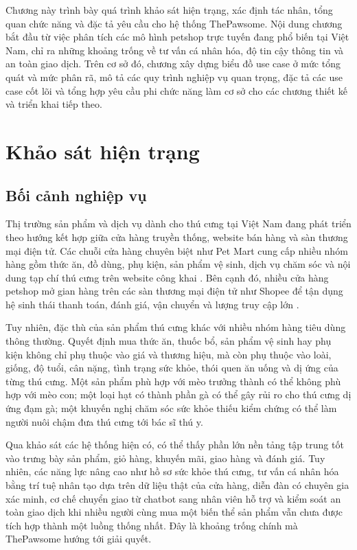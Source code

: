 \documentclass[../DoAn.tex]{subfiles}
\begin{document}
\raggedbottom

Chương này trình bày quá trình khảo sát hiện trạng, xác định tác nhân, tổng quan chức năng và đặc tả yêu cầu cho hệ thống ThePawsome. Nội dung chương bắt đầu từ việc phân tích các mô hình petshop trực tuyến đang phổ biến tại Việt Nam, chỉ ra những khoảng trống về tư vấn cá nhân hóa, độ tin cậy thông tin và an toàn giao dịch. Trên cơ sở đó, chương xây dựng biểu đồ use case ở mức tổng quát và mức phân rã, mô tả các quy trình nghiệp vụ quan trọng, đặc tả các use case cốt lõi và tổng hợp yêu cầu phi chức năng làm cơ sở cho các chương thiết kế và triển khai tiếp theo.

\section{Khảo sát hiện trạng}
\label{section:2.1}

\subsection{Bối cảnh nghiệp vụ}
\label{subsection:2.1.1}

Thị trường sản phẩm và dịch vụ dành cho thú cưng tại Việt Nam đang phát triển theo hướng kết hợp giữa cửa hàng truyền thống, website bán hàng và sàn thương mại điện tử. Các chuỗi cửa hàng chuyên biệt như Pet Mart cung cấp nhiều nhóm hàng gồm thức ăn, đồ dùng, phụ kiện, sản phẩm vệ sinh, dịch vụ chăm sóc và nội dung tạp chí thú cưng trên website công khai \cite{petmart2026}. Bên cạnh đó, nhiều cửa hàng petshop mở gian hàng trên các sàn thương mại điện tử như Shopee để tận dụng hệ sinh thái thanh toán, đánh giá, vận chuyển và lượng truy cập lớn \cite{chumsaupetShopee2026,marspetcareShopee2026}.

Tuy nhiên, đặc thù của sản phẩm thú cưng khác với nhiều nhóm hàng tiêu dùng thông thường. Quyết định mua thức ăn, thuốc bổ, sản phẩm vệ sinh hay phụ kiện không chỉ phụ thuộc vào giá và thương hiệu, mà còn phụ thuộc vào loài, giống, độ tuổi, cân nặng, tình trạng sức khỏe, thói quen ăn uống và dị ứng của từng thú cưng. Một sản phẩm phù hợp với mèo trưởng thành có thể không phù hợp với mèo con; một loại hạt có thành phần gà có thể gây rủi ro cho thú cưng dị ứng đạm gà; một khuyến nghị chăm sóc sức khỏe thiếu kiểm chứng có thể làm người nuôi chậm đưa thú cưng tới bác sĩ thú y.

Qua khảo sát các hệ thống hiện có, có thể thấy phần lớn nền tảng tập trung tốt vào trưng bày sản phẩm, giỏ hàng, khuyến mãi, giao hàng và đánh giá. Tuy nhiên, các năng lực nâng cao như hồ sơ sức khỏe thú cưng, tư vấn cá nhân hóa bằng trí tuệ nhân tạo dựa trên dữ liệu thật của cửa hàng, diễn đàn có chuyên gia xác minh, cơ chế chuyển giao từ chatbot sang nhân viên hỗ trợ và kiểm soát an toàn giao dịch khi nhiều người cùng mua một biến thể sản phẩm vẫn chưa được tích hợp thành một luồng thống nhất. Đây là khoảng trống chính mà ThePawsome hướng tới giải quyết.
\end{document}
